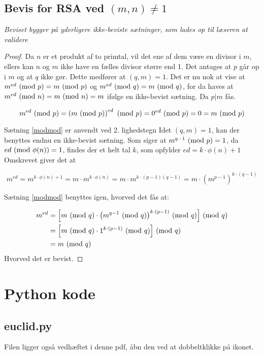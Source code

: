 \subsection{Bevis for RSA ved \texorpdfstring{\((m, n) \neq 1\)}{(m, n) ≠ 1}}\label{proofrsa}
\textit{Beviset bygger på yderligere ikke-beviste sætninger, som lades op til læseren at validere}
\begin{proof}
    Da \(n\) er et produkt af to primtal, vil det ene af dem være en divisor i \(m\),
    ellers kan \(n\) og \(m\) ikke have en fælles divisor større end 1.
    Det antages at \(p\) går op i \(m\) og at \(q\) ikke gør.
    Dette medfører at \((q, m) = 1\).
    Det er nu nok at vise at \(m^{ed} \ (\mathrm{mod}\ p) = m \ (\mathrm{mod}\ p)\)
    og \(m^{ed} \ (\mathrm{mod}\ q) = m \ (\mathrm{mod}\ q)\),
    for da haves at \(m^{e d} \ (\mathrm{mod}\ n) = m \ (\mathrm{mod}\ n) = m\) ifølge en ikke-bevist sætning.
    Da \(p | m\) fås.

    \[m^{e d} \ (\mathrm{mod}\ p) = \left( m \ (\mathrm{mod}\ p) \right)^{e d} \ (\mathrm{mod}\ p) = 0^{e d} \ (\mathrm{mod}\ p) = 0 = m \ (\mathrm{mod}\ p)\]

    Sætning \ref{modmod} er anvendt ved 2. lighedstegn
    Idet \((q, m) = 1\), kan der benyttes endnu en ikke-bevist sætning.
    Som siger at \(m^{q - 1} \ (\mathrm{mod}\ p) = 1\),
    da \(e d \ (\mathrm{mod}\ \phi(n)) = 1\), findes der et helt tal \(k\),
    som opfylder \(e d = k \cdot \phi(n) + 1\)
    Omskrevet giver det at

    \[m^{e d} = m^{k \cdot \phi(n) + 1} = m \cdot m^{k \cdot \phi(n)} = m \cdot m^{k \cdot (p - 1) (q - 1)} = m \cdot (m^{p - 1})^{k \cdot (q - 1)}\]

    Sætning \ref{modmod} benyttes igen, hvorved det fås at:

    \begin{align*}
        m^{e d} &= \Big[ m \ (\mathrm{mod}\ q) \cdot \big( m^{q - 1} \ (\mathrm{mod}\ q) \big)^{k \cdot (p - 1)} \ (\mathrm{mod}\ q) \Big] \ (\mathrm{mod}\ q)\\
                &= \Big[ m \ (\mathrm{mod}\ q) \cdot 1^{k \cdot (p - 1)} \ (\mathrm{mod}\ q) \Big] \ (\mathrm{mod}\ q)\\
                &= m \ (\mathrm{mod}\ q)
    \end{align*}
    Hvorved det er bevist.\cite[19]{vestergaard}
\end{proof}




\newpage
\section{Python kode}
\subsection{euclid.py}
\label{file:euclid}
Filen ligger også vedhæftet i denne pdf, åbn den ved at dobbeltklikke på ikonet.
\inputminted[python3, linenos, breaklines, frame=lines, fontsize=\footnotesize]{python}{src/euclid.py}


